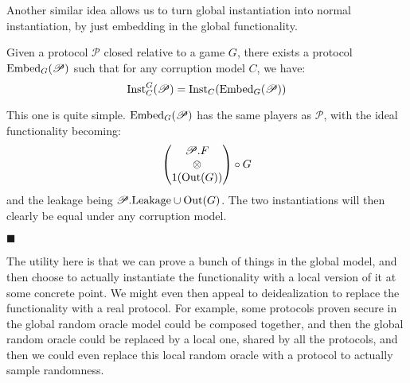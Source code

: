 Another similar idea allows us to turn global instantiation
into normal instantiation, by just embedding in the global functionality.

\begin{lemma}
  Given a protocol $\mathscr{P}$ closed relative to a game $G$,
  there exists a protocol $\text{Embed}_G(\mathscr{P})$ such that for any
  corruption model $C$, we have:
  $$
  \text{Inst}^G_C(\mathscr{P}) = \text{Inst}_C(\text{Embed}_G(\mathscr{P}))
  $$

  This one is quite simple. $\text{Embed}_G(\mathscr{P})$ has the same players
  as $\mathscr{P}$, with the ideal functionality becoming:
  $$
  \begin{pmatrix}
    \mathscr{P}.F\cr
    \otimes\cr
    1(\text{Out}(G))
  \end{pmatrix}
  \circ G
  $$
  and the leakage being $\mathscr{P}.\text{Leakage} \cup \text{Out}(G)$.
  The two instantiations will then clearly be equal under any corruption model.

  $\blacksquare$
\end{lemma}

The utility here is that we can prove a bunch of things in the
global model,
and then choose to actually instantiate the functionality
with a local version of it at some concrete point.
We might even then appeal to deidealization to replace the functionality
with a real protocol.
For example, some protocols proven secure in the global random oracle
model could be composed together,
and then the global random oracle could be replaced
by a local one, shared by all the protocols,
and then we could even replace this local random oracle with a
protocol to actually sample randomness.
